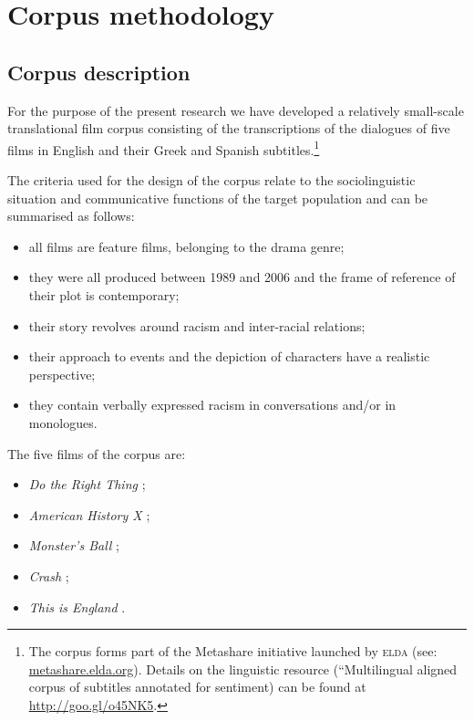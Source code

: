 \documentclass[output=paper]{LSP/langsci}
\begin{document}
\section{Corpus methodology} \label{sec:2:3}

\subsection{Corpus description} \label{sec:2:3:1}

For the purpose of the present research we have developed a relatively small-scale translational film corpus consisting of the transcriptions of the dialogues of five films in English and their Greek and Spanish subtitles.\footnote{The corpus forms part of the Metashare initiative launched by \textsc{elda} (see: \url{metashare.elda.org}). Details on the linguistic resource (“Multilingual aligned corpus of subtitles annotated for sentiment) can be found at \url{http://goo.gl/o45NK5}.}

The criteria used for the design of the corpus relate to the sociolinguistic situation and communicative functions \citep[49--52]{Saridakis2010} of the target population and can be summarised as follows:

\begin{itemize}
\item all films are feature films, belonging to the drama genre;
\item they were all produced between 1989 and 2006 and the frame of reference of their plot is contemporary;
\item their story revolves around racism and inter-racial relations;
\item their approach to events and the depiction of characters have a realistic perspective;
\item they contain verbally expressed racism in conversations and/or in monologues.
\end{itemize}

The five films of the corpus are:

\begin{itemize}
\item \textit{Do the Right Thing} \citep{Lee1989};
\item \textit{American History X} \citep{Kaye1998};
\item \textit{Monster's Ball} \citep{Forster2001};
\item \textit{Crash} \citep{Haggis2004};
\item \textit{This is England} \citep{Meadows2006}.
\end{itemize}
\end{document}
